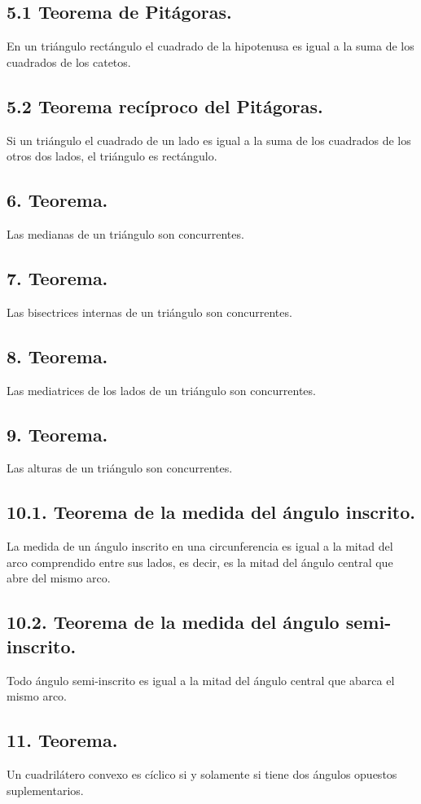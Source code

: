 \documentclass[12pt,a4paper]{article}
\begin{document}
\subsection*{5.1 Teorema de Pitágoras.}
En un triángulo rectángulo el cuadrado de la hipotenusa es igual a la suma de los cuadrados de los catetos.
\subsection*{5.2 Teorema recíproco del Pitágoras.}
Si un triángulo el cuadrado de un lado es igual a la suma de los cuadrados de los otros dos lados, el triángulo es rectángulo.
\subsection*{6. Teorema.}
Las medianas de un triángulo son concurrentes.
\subsection*{7. Teorema.}
Las bisectrices internas de un triángulo son concurrentes.
\subsection*{8. Teorema.}
Las mediatrices de los lados de un triángulo son concurrentes.
\subsection*{9. Teorema.}
Las alturas de un triángulo son concurrentes.
\subsection*{10.1. Teorema de la medida del ángulo inscrito.}
La medida de un ángulo inscrito en una circunferencia es igual a la mitad del arco comprendido entre sus lados, es decir, es la mitad del ángulo central que abre del mismo arco.
\subsection*{10.2. Teorema de la medida del ángulo semi-inscrito.}
Todo ángulo semi-inscrito es igual a la mitad del ángulo central que abarca el mismo arco.
\subsection*{11. Teorema.}
Un cuadrilátero convexo es cíclico si y solamente si tiene dos ángulos opuestos suplementarios.
\end{document}
